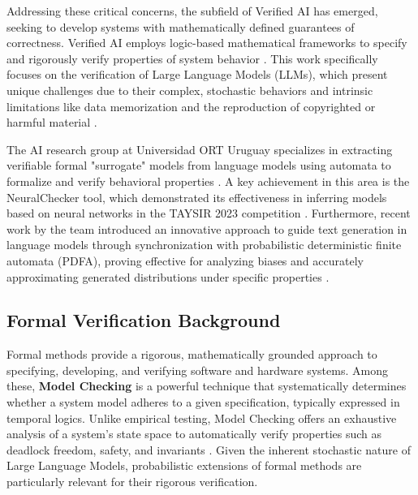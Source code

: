 \documentclass{article}
\begin{document}
Addressing these critical concerns, the subfield of Verified AI has emerged, seeking to develop systems with mathematically defined guarantees of correctness. Verified AI employs logic-based mathematical frameworks to specify and rigorously verify properties of system behavior \cite{wing2021trustworthy, seshia2022toward}. This work specifically focuses on the verification of Large Language Models (LLMs), which present unique challenges due to their complex, stochastic behaviors and intrinsic limitations like data memorization and the reproduction of copyrighted or harmful material \cite{kuchnik2023validating}.

The AI research group at Universidad ORT Uruguay specializes in extracting verifiable formal "surrogate" models from language models using automata to formalize and verify behavioral properties \cite{mayr2018regular, mayr2020fly, mayr2021property, mayr2022towards, mayr2023congruence}. A key achievement in this area is the NeuralChecker tool, which demonstrated its effectiveness in inferring models based on neural networks in the TAYSIR 2023 competition \cite{neural_checker, taysir2023, mayr2023results}. Furthermore, recent work by the team introduced an innovative approach to guide text generation in language models through synchronization with probabilistic deterministic finite automata (PDFA), proving effective for analyzing biases and accurately approximating generated distributions under specific properties \cite{carrasco2024analyzing}.

\subsection{Formal Verification Background}

Formal methods provide a rigorous, mathematically grounded approach to specifying, developing, and verifying software and hardware systems. Among these, \textbf{Model Checking} is a powerful technique that systematically determines whether a system model adheres to a given specification, typically expressed in temporal logics. Unlike empirical testing, Model Checking offers an exhaustive analysis of a system's state space to automatically verify properties such as deadlock freedom, safety, and invariants \cite{clarke2009model, baier2008principles}. Given the inherent stochastic nature of Large Language Models, probabilistic extensions of formal methods are particularly relevant for their rigorous verification.
\end{document}
